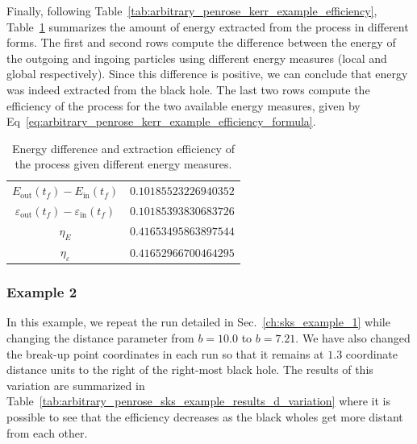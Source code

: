 Finally, following Table~\ref{tab:arbitrary_penrose_kerr_example_efficiency}, Table~\ref{tab:arbitrary_penrose_sks_example_efficiency} summarizes the amount of energy extracted from the process in different forms. The first and second rows compute the difference between the energy of the outgoing and ingoing particles using different energy measures (local and global respectively). Since this difference is positive, we can conclude that energy was indeed extracted from the black hole. The last two rows compute the efficiency of the process for the two available energy measures, given by Eq~\eqref{eq:arbitrary_penrose_kerr_example_efficiency_formula}.
\begin{table}[]
  \centering
  \begin{tabular}{cc}
    \hline\hline
    $E_\text{out}(t_f)-E_\text{in}(t_f)$                     & $0.10185523226940352$ \\
    $\varepsilon_\text{out}(t_f)-\varepsilon_\text{in}(t_f)$ & $0.10185393830683726$ \\
    $\eta_E$                                                 & $0.41653495863897544$ \\
    $\eta_\varepsilon$                                       & $0.41652966700464295$ \\ \hline\hline
  \end{tabular}
  \caption{Energy difference and extraction efficiency of the process given different energy measures.}
  \label{tab:arbitrary_penrose_sks_example_efficiency}
\end{table}

\subsubsection{Example 2}
\label{ch:sks_example_2}

In this example, we repeat the run detailed in Sec.~\ref{ch:sks_example_1} while changing the distance parameter from $b=10.0$ to $b = 7.21$. We have also changed the break-up point coordinates in each run so that it remains at $1.3$ coordinate distance units to the right of the right-most black hole. The results of this variation are summarized in Table~\ref{tab:arbitrary_penrose_sks_example_results_d_variation} where it is possible to see that the efficiency decreases as the black wholes get more distant from each other.

